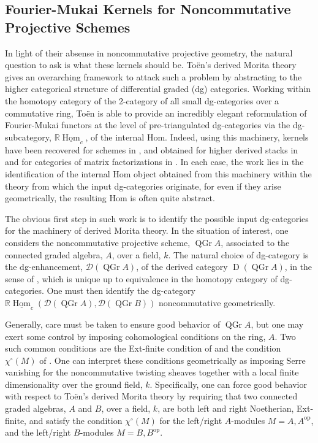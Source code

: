 \subsection*{Fourier-Mukai Kernels for Noncommutative Projective Schemes}

In light of their absense in noncommutative projective geometry, the natural question to ask is what these kernels should be.
To\"en's derived Morita theory \parencite{Toen07} gives an overarching framework to attack such a problem by abstracting to the higher categorical structure of differential graded (dg) categories.
Working within the homotopy category of the 2-category of all small dg-categories over a commutative ring, To\"en is able to provide an incredibly elegant reformulation of Fourier-Mukai functors at the level of pre-triangulated dg-categories via the dg-subcategory, \(\mathbb{R}\underline{\operatorname{Hom}}_c\), of the internal Hom.
Indeed, using this machinery, kernels have been recovered for schemes in \parencite{Toen07}, and obtained for higher derived stacks in \parencite{BFN10} and for categories of matrix factorizations in \parencite{Dyckerhoff11,PV12,BFK14}.
In each case, the work lies in the identification of the internal Hom object obtained from this machinery within the theory from which the input dg-categories originate, for even if they arise geometrically, the resulting Hom is often quite abstract.

The obvious first step in such work is to identify the possible input dg-categories for the machinery of derived Morita theory.
In the situation of interest, one considers the noncommutative projective scheme, \(\operatorname{QGr} A\), associated to the connected graded algebra, \(A\), over a field, \(k\). 
The natural choice of dg-category is the dg-enhancement, \(\mathcal{D}(\operatorname{QGr} A)\), of the derived category \(\operatorname{D}(\operatorname{QGr} A)\), in the sense of \parencite{Lunts-Orlov}, which is unique up to equivalence in the homotopy category of dg-categories.
One must then identify the dg-category \(\mathbb{R}\underline{\operatorname{Hom}}_c(\mathcal{D}(\operatorname{QGr} A), \mathcal{D}(\operatorname{QGr} B))\) noncommutative geometrically.

Generally, care must be taken to ensure good behavior of \(\operatorname{QGr} A\), but one may exert some control by imposing cohomological conditions on the ring, \(A\).
Two such common conditions are the Ext-finite condition of \parencite{BVdB} and the condition \(\chi^\circ(M)\) of \parencite{AZ94}.
One can interpret these conditions geometrically as imposing Serre vanishing for the noncommutative twisting sheaves together with a local finite dimensionality over the ground field, \(k\).
Specifically, one can force good behavior with respect to To\"en's derived Morita theory by requiring that two connected graded algebras, \(A\) and \(B\), over a field, \(k\), are both left and right Noetherian, Ext-finite, and satisfy the condition \(\chi^\circ(M)\) for the left/right \(A\)-modules \(M = A, A^{\operatorname{op}}\), and the left/right \(B\)-modules \(M = B, B^{\operatorname{op}}\).

